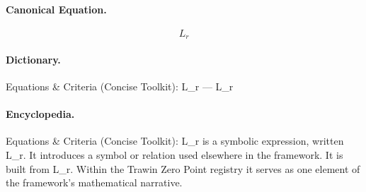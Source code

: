 \paragraph{Canonical Equation.}
\[
L_r
\]

\paragraph{Dictionary.}
Equations \& Criteria (Concise Toolkit): L\_r — L\_r

\paragraph{Encyclopedia.}
Equations \& Criteria (Concise Toolkit): L\_r is a symbolic expression, written L\_r. It introduces a symbol or relation used elsewhere in the framework. It is built from L\_r. Within the Trawin Zero Point registry it serves as one element of the framework's mathematical narrative.
